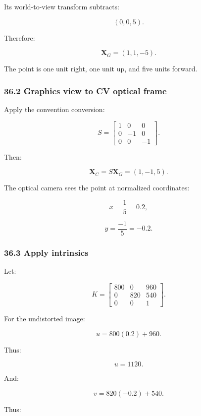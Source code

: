 Its world-to-view transform subtracts:

\[
 (0,0,5).
\]

Therefore:

\[
 \boxed{ \mathbf X_G=(1,1,-5) }.
\]

The point is one unit right, one unit up, and five units forward.

\subsubsection{36.2 Graphics view to CV optical frame}\label{02-foundations-ii-ch037-graphics-view-to-cv-optical-frame}

\hypertarget{02-foundations-ii-ch037-graphics-view-to-cv-optical-frame}{}

Apply the convention conversion:

\[
 S= \begin{bmatrix} 1&0&0\\ 0&-1&0\\ 0&0&-1 \end{bmatrix}.
\]

Then:

\[
 \boxed{ \mathbf X_C=S\mathbf X_G=(1,-1,5) }.
\]

The optical camera sees the point at normalized coordinates:

\[
 x=\frac15=0.2,
\]

\[
 y=\frac{-1}{5}=-0.2.
\]

\subsubsection{36.3 Apply intrinsics}\label{02-foundations-ii-ch037-apply-intrinsics}

\hypertarget{02-foundations-ii-ch037-apply-intrinsics}{}

Let:

\[
 K= \begin{bmatrix} 800&0&960\\ 0&820&540\\ 0&0&1 \end{bmatrix}.
\]

For the undistorted image:

\[
 u=800(0.2)+960.
\]

Thus:

\[
 \boxed{u=1120}.
\]

And:

\[
 v=820(-0.2)+540.
\]

Thus:


